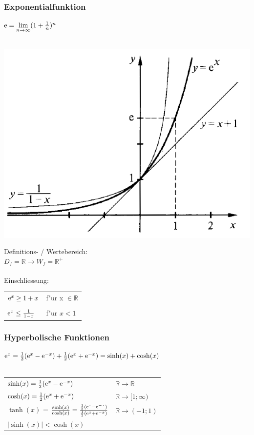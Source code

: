 		\subsubsection{Exponentialfunktion}
			$\mathrm{e} = \lim\limits_{n \to \infty} (1+\frac{1}{n})^n $ \\
				\\
			\begin{minipage}{.45\linewidth}
				\includegraphics[width=0.95\linewidth]{Bilder/exp-funktion}
			\end{minipage}
			\hfill
			\begin{minipage}{.5\linewidth}
				Definitions- / Wertebereich: \\
				$D_f = \mathbb{R} \rightarrow W_f = \mathbb{R^+}$ \\
				\\
				Einschliessung: \\
					\begin{tabular}{ll}
					$\mathrm{e}^x \geq 1 + x$ & f"ur x $\in \mathbb{R}$ \\
					\\
					$\mathrm{e}^x \leq \frac{1}{1-x}$ & f"ur $x < 1$  \\
					\end{tabular}
			\end{minipage}

		\subsubsection{Hyperbolische Funktionen}
			$\mathrm{e}^x = \frac{1}{2} (\mathrm{e}^x - \mathrm{e}^{-x}) + \frac{1}{2} (\mathrm{e}^x + \mathrm{e}^{-x}) = \sinh(x) + \cosh(x)$ \\
			\\
			\begin{tabular}{ll}
				$\sinh(x) = \frac{1}{2} (\mathrm{e}^x - \mathrm{e}^{-x})$ & $\mathbb{R} \rightarrow \mathbb{R}$ \\
				$\cosh(x) = \frac{1}{2} (\mathrm{e}^x + \mathrm{e}^{-x})$ & $\mathbb{R} \rightarrow [1; \infty)$ \\
				$\tanh(x)$ = $\frac{\sinh(x)}{\cosh(x)} = \frac{\frac{1}{2} (\mathrm{e}^x - \mathrm{e}^{-x})}{\frac{1}{2} (\mathrm{e}^x + \mathrm{e}^{-x})}$ & $\mathbb{R} \rightarrow (-1; 1)$ \\	
				$\vert \sinh(x) \vert < \cosh(x)$	& \\
			\end{tabular}
			
